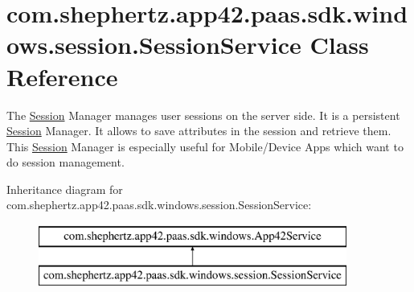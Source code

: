 \hypertarget{classcom_1_1shephertz_1_1app42_1_1paas_1_1sdk_1_1windows_1_1session_1_1_session_service}{\section{com.\+shephertz.\+app42.\+paas.\+sdk.\+windows.\+session.\+Session\+Service Class Reference}
\label{classcom_1_1shephertz_1_1app42_1_1paas_1_1sdk_1_1windows_1_1session_1_1_session_service}
}


The \hyperlink{classcom_1_1shephertz_1_1app42_1_1paas_1_1sdk_1_1windows_1_1session_1_1_session}{Session} Manager manages user sessions on the server side. It is a persistent \hyperlink{classcom_1_1shephertz_1_1app42_1_1paas_1_1sdk_1_1windows_1_1session_1_1_session}{Session} Manager. It allows to save attributes in the session and retrieve them. This \hyperlink{classcom_1_1shephertz_1_1app42_1_1paas_1_1sdk_1_1windows_1_1session_1_1_session}{Session} Manager is especially useful for Mobile/\+Device Apps which want to do session management.  


Inheritance diagram for com.\+shephertz.\+app42.\+paas.\+sdk.\+windows.\+session.\+Session\+Service\+:\begin{figure}[H]
\begin{center}
\leavevmode
\includegraphics[height=2.000000cm]{classcom_1_1shephertz_1_1app42_1_1paas_1_1sdk_1_1windows_1_1session_1_1_session_service}
\end{center}
\end{figure}
